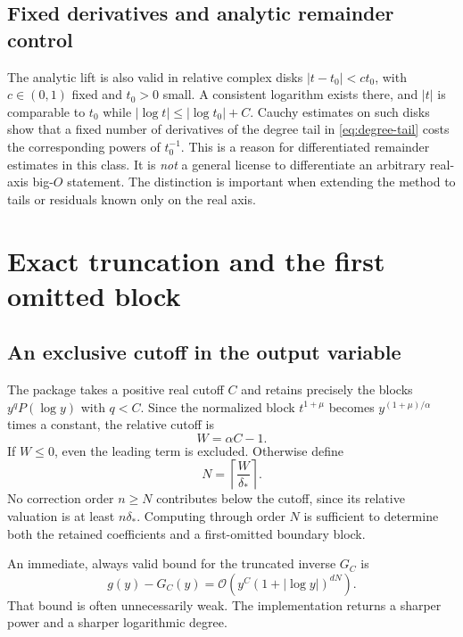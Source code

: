 \documentclass[11pt,a4paper]{article}
\numberwithin{equation}{section}
\theoremstyle{definition}\newtheorem{definition}[theorem]{Definition}
\theoremstyle{remark}\newtheorem{remark}[theorem]{Remark}
\newcommand{\bigO}{\mathcal O}
\begin{document}
\subsection{Fixed derivatives and analytic remainder control}
The analytic lift is also valid in relative complex disks
\(|t-t_0|<c t_0\), with \(c\in(0,1)\) fixed and \(t_0>0\) small. A consistent
logarithm exists there, and \(|t|\) is comparable to \(t_0\) while
\(|\log t|\le |\log t_0|+C\). Cauchy estimates on such disks show that a
fixed number of derivatives of the degree tail in
\eqref{eq:degree-tail} costs the corresponding powers of \(t_0^{-1}\).
This is a reason for differentiated remainder estimates in this class.
It is \emph{not} a general license to differentiate an arbitrary real-axis
big-\(O\) statement. The distinction is important when extending the method
to tails or residuals known only on the real axis.

\section{Exact truncation and the first omitted block}
\label{sec:truncation}

\subsection{An exclusive cutoff in the output variable}
The package takes a positive real cutoff \(C\) and retains precisely the
blocks \(y^q P(\log y)\) with \(q<C\). Since the normalized block
\(t^{1+\mu}\) becomes \(y^{(1+\mu)/\alpha}\) times a constant, the relative
cutoff is
\begin{equation}\label{eq:cutoff}
 W=\alpha C-1.
\end{equation}
If \(W\le0\), even the leading term is excluded. Otherwise define
\begin{equation}\label{eq:nmax}
 N=\left\lceil\frac{W}{\delta_*}\right\rceil.
\end{equation}
No correction order \(n\ge N\) contributes below the cutoff, since its
relative valuation is at least \(n\delta_*\). Computing through order \(N\)
is sufficient to determine both the retained coefficients and a first-omitted
boundary block.

An immediate, always valid bound for the truncated inverse \(G_C\) is
\[
 g(y)-G_C(y)=\bigO\!\left(y^C(1+|\log y|)^{dN}\right).
\]
That bound is often unnecessarily weak. The implementation returns a sharper
power and a sharper logarithmic degree.
\end{document}
